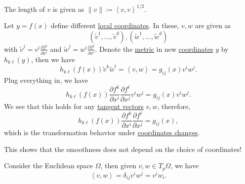 \begin{remark}
	The length of \(v\) is given as \(\lVert v \rVert \coloneqq \left\langle v, v \right\rangle ^{1 / 2}\).
\end{remark}

Let \(y = f(x)\) define different \hyperref[def:coordinate-chart]{local coordinates}. In these, \(v, w\) are given as
\[
	(\widetilde{v} ^1, \dots , \widetilde{v} ^d), (\widetilde{w} ^1, \dots , \widetilde{w} ^d)
\]
with \(\widetilde{v} ^j = v^i \frac{\partial f^j}{\partial x^i} \) and \(\widetilde{w} ^j = w^i \frac{\partial f^j}{\partial x^i} \). Denote the \hyperref[def:Riemannian-metric]{metric} in new \hyperref[def:coordinate-chart]{coordinates} \(y\) by \(h_{k \ell }(y)\), then we have
\[
	h_{k \ell }(f(x))\widetilde{v} ^k \widetilde{w} ^\ell
	= \left\langle v, w \right\rangle
	= g_{ij}(x)v^i w^j .
\]
Plug everything in, we have
\[
	h_{k \ell }(f(x)) \frac{\partial f^k}{\partial x^i} \frac{\partial f^{\ell } }{\partial x^j} v^i w^j
	= g_{ij}(x) v^i w^j.
\]
We see that this holds for any \hyperref[def:tangent-vector]{tangent vectors} \(v, w\), therefore,
\[
	h_{k \ell }(f(x)) \frac{\partial f^k}{\partial x^i} \frac{\partial f^{\ell } }{\partial x^j} = g_{ij} (x),
\]
which is the transformation behavior under \hyperref[def:coordinate-transition]{coordinates changes}.

\begin{remark}
	This shows that the smoothness does not depend on the choice of coordinates!
\end{remark}

\begin{eg}
	Consider the Euclidean space \(\Omega \), then given \(v, w\in T_p \Omega \), we have
	\[
		\left\langle v, w \right\rangle
		= \delta _{ij} v^i w^j
		= v^i w_i.
	\]
\end{eg}

